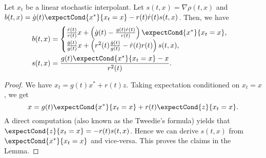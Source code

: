\begin{lemma}\label{lemma_app:b_and_s}
    Let $x_t$ be a linear stochastic interpolant. Let $s(t,x) = \nabla \rho(t,x)$ and $b(t,x) = \dot g(t)\expectCond{x^*}{x_t=x}-r(t)\dot r(t)s(t,x)$. Then, we have
\begin{equation}\label{eqn_app:b_and_s}
\begin{split}
  b(t,x) &= \begin{cases}
      \frac{\dot r(t)}{r(t)}x+\left(\dot g(t)-\frac{g(t)\dot r(t)}{r(t)}\right)\expectCond{x^*}{x_t=x},\\
      \frac{\dot g(t)}{g(t)}x+\left(r^2(t)\frac{\dot g(t)}{g(t)}-\dot r(t)r(t)\right)s(t,x),
      \end{cases}\\
s(t,x) &= \frac{g(t)\expectCond{x^*}{x_t=x}-x}{r^2(t)}.  
\end{split}
\end{equation}
\end{lemma}
\begin{proof}
    We have $x_t=g(t)x^*+r(t)z$. Taking expectation conditioned on $x_t=x$, we get
    \begin{equation*}
        x = g(t)\expectCond{x^*}{x_t=x}+r(t)\expectCond{z}{x_t=x}.
    \end{equation*}
    A direct computation (also known as the Tweedie's formula) yields that $\expectCond{z}{x_t=x} = -r(t)s(t,x)$. Hence we can derive $s(t,x)$ from $\expectCond{x^*}{x_t=x}$ and vice-versa. This proves the claims in the Lemma.
    
\end{proof}


